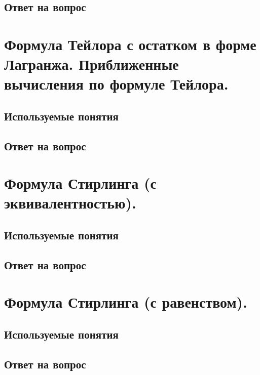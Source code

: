 \documentclass[12pt,a4paper]{article}
\begin{document}
\subsection{Ответ на вопрос}


\newpage
\section{Формула Тейлора с остатком в форме Лагранжа. Приближенные вычисления по формуле Тейлора.}

\subsection{Используемые понятия}


\subsection{Ответ на вопрос}


\newpage
\section{Формула Стирлинга (с эквивалентностью).}

\subsection{Используемые понятия}


\subsection{Ответ на вопрос}


\newpage
\section{Формула Стирлинга (с равенством).}

\subsection{Используемые понятия}


\subsection{Ответ на вопрос}

\end{document}
